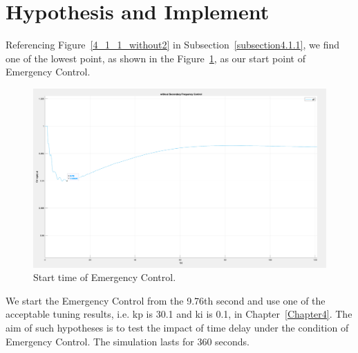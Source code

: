 \section{Hypothesis and Implement} %
Referencing Figure~\ref{4_1_1_without2} in Subsection~\ref{subsection4.1.1}, we find one of the lowest point, as shown in the Figure~\ref{6_2_g9}, as our start point of Emergency Control.  

\begin{figure}[htbp]
\centering
\includegraphics[width = .819\textwidth]{figure/6_2_g9.png}
\caption{Start time of Emergency Control.}
\label{6_2_g9}
\end{figure}

We start the Emergency Control from the 9.76th second and use one of the acceptable tuning results, i.e. kp is 30.1 and ki is 0.1, in Chapter~\ref{Chapter4}. The aim of such hypotheses is to test the impact of time delay under the condition of Emergency Control. The simulation lasts for 360 seconds. 